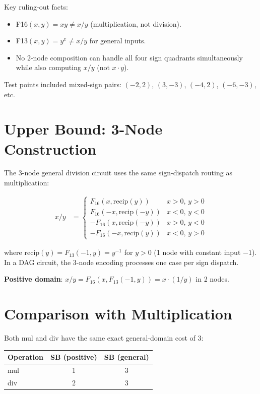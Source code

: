 \documentclass[12pt]{article}
\begin{document}
Key ruling-out facts:
\begin{itemize}
  \item F16$(x,y) = xy \neq x/y$ (multiplication, not division).
  \item F13$(x,y) = y^x \neq x/y$ for general inputs.
  \item No 2-node composition can handle all four sign quadrants simultaneously
        while also computing $x/y$ (not $x \cdot y$).
\end{itemize}

Test points included mixed-sign pairs: $(-2, 2)$, $(3, -3)$, $(-4, 2)$, $(-6, -3)$, etc.

\section{Upper Bound: 3-Node Construction}

The 3-node general division circuit uses the same sign-dispatch routing as multiplication:

\begin{align*}
  x/y &= \begin{cases}
    F_{16}(x, \mathrm{recip}(y)) & x > 0,\, y > 0 \\
    F_{16}(-x, \mathrm{recip}(-y)) & x < 0,\, y < 0 \\
    -F_{16}(x, \mathrm{recip}(-y)) & x > 0,\, y < 0 \\
    -F_{16}(-x, \mathrm{recip}(y)) & x < 0,\, y > 0
  \end{cases}
\end{align*}

where $\mathrm{recip}(y) = F_{13}(-1, y) = y^{-1}$ for $y > 0$ (1 node with constant input $-1$).
In a DAG circuit, the 3-node encoding processes one case per sign dispatch.

\textbf{Positive domain}: $x/y = F_{16}(x, F_{13}(-1, y)) = x \cdot (1/y)$ in 2 nodes.

\section{Comparison with Multiplication}

Both mul and div have the same exact general-domain cost of 3:

\begin{center}
\begin{tabular}{lcc}
\toprule
Operation & SB (positive) & SB (general) \\
\midrule
mul & 1 & 3 \\
div & 2 & 3 \\
\bottomrule
\end{tabular}
\end{center}
\end{document}
